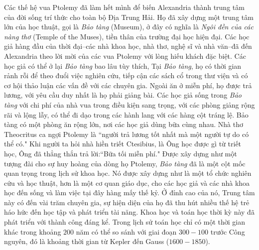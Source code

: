 \begin{multicols}{2}
	\vskip 0.1cm
	Các thế hệ vua Ptolemy đã làm hết mình để biến Alexandria thành trung tâm của đời sống trí thức cho toàn bộ Địa Trung Hải. Họ đã xây dựng một trung tâm lớn của học thuật, gọi là \textit{Bảo tàng} (Museum), ở đây có nghĩa là \textit{Ngôi đền của các nàng thơ} (Temple of the Muses), tiền thân của trường đại học hiện đại. Các học giả hàng đầu của thời đại--các nhà khoa học, nhà thơ, nghệ sĩ và nhà văn--đã đến Alexandria theo lời mời của các vua Ptolemy với lòng hiếu khách đặc biệt. Các học giả có thể ở lại \textit{Bảo tàng} bao lâu tùy thích, Tại \textit{Bảo tàng}, họ có thời gian rảnh rỗi để theo đuổi việc nghiên cứu, tiếp cận các sách cổ trong thư viện và có cơ hội thảo luận các vấn đề với các chuyên gia.  Ngoài ăn ở miễn phí, họ được trả lương, với yêu cầu duy nhất là họ phải giảng bài. Các học giả sống trong \textit{Bảo tàng} với chi phí của nhà vua trong điều kiện sang trọng, với các phòng giảng rộng rãi và lộng lẫy, có thể đi dạo trong các hành lang với các hàng cột tráng lệ. Bảo tàng có một phòng ăn rộng lớn, nơi các học giả dùng bữa cùng nhau. Nhà thơ Theocritus ca ngợi Ptolemy là ``người trả lương tốt nhất mà một người tự do có thể có." Khi người ta hỏi nhà hiền triết Ctesibius, là Ông học được gì từ triết học, Ông đã thẳng thắn trả lời:``Bữa tối miễn phí."
	\vskip 0.1cm
	Được xây dựng như một tượng đài cho sự huy hoàng của dòng họ Ptolemy, \textit{Bảo tàng} đã là một cột mốc quan trọng trong lịch sử khoa học. Nó được xây dựng như là một tổ chức nghiên cứu và học thuật, hơn là một cơ quan giáo dục, cho các học giả và các nhà khoa học đến sống và làm việc tại đây hàng mấy thế kỷ. Ở đỉnh cao của nó, Trung tâm này có đến vài trăm chuyên gia, sự hiện diện của họ đã thu hút nhiều thế hệ trẻ háo hức đến học tập và phát triển tài năng. Khoa học và toán học thời kỳ này đã phát triển với thành công đáng kể. Trong lịch sử toán học chỉ có một thời gian khác trong khoảng $200$ năm có thể so sánh với giai đoạn $300-100$ trước Công nguyên, đó là khoảng thời gian từ Kepler đến Gauss ($1600-1850$).
	\begin{figure}[H]
		\vspace*{-5pt}
		\centering
		\captionsetup{labelformat= empty, justification=centering}

\end{figure}
\end{multicols}

